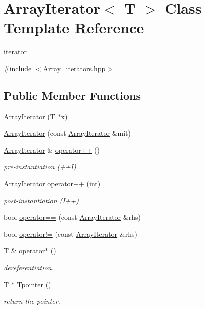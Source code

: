 \hypertarget{classArrayIterator}{}\section{Array\+Iterator$<$ T $>$ Class Template Reference}
\label{classArrayIterator}


iterator  




{\ttfamily \#include $<$Array\+\_\+iterators.\+hpp$>$}

\subsection*{Public Member Functions}
\begin{DoxyCompactItemize}
\item 
\hyperlink{classArrayIterator_a650c33a77485acadfe1db8eec612020d}{Array\+Iterator} (T $\ast$x)
\item 
\hyperlink{classArrayIterator_a001bb049c3eddf473fa6b3fcf5b44559}{Array\+Iterator} (const \hyperlink{classArrayIterator}{Array\+Iterator} \&mit)
\item 
\hyperlink{classArrayIterator}{Array\+Iterator} \& \hyperlink{classArrayIterator_a089ab3c97d0133fcd778b35086b9aa1c}{operator++} ()
\begin{DoxyCompactList}\small\item\em pre-\/instantiation (++\+I) \end{DoxyCompactList}\item 
\hyperlink{classArrayIterator}{Array\+Iterator} \hyperlink{classArrayIterator_aa63a6291ac8a3e20b6051b0f2fbad27a}{operator++} (int)
\begin{DoxyCompactList}\small\item\em post-\/instantiation (I++) \end{DoxyCompactList}\item 
bool \hyperlink{classArrayIterator_a0dae7a77a39a0bd1799cc209775589bd}{operator==} (const \hyperlink{classArrayIterator}{Array\+Iterator} \&rhs)
\item 
bool \hyperlink{classArrayIterator_abbbd89f94af592c09bc768d0f842bdb3}{operator!=} (const \hyperlink{classArrayIterator}{Array\+Iterator} \&rhs)
\item 
T \& \hyperlink{classArrayIterator_a42889f9485e5477403155060a8686b44}{operator$\ast$} ()
\begin{DoxyCompactList}\small\item\em dereferentiation. \end{DoxyCompactList}\item 
T $\ast$ \hyperlink{classArrayIterator_abf1239e6b314c137b836beb0be217c60}{Tpointer} ()
\begin{DoxyCompactList}\small\item\em return the pointer. \end{DoxyCompactList}\end{DoxyCompactItemize}
